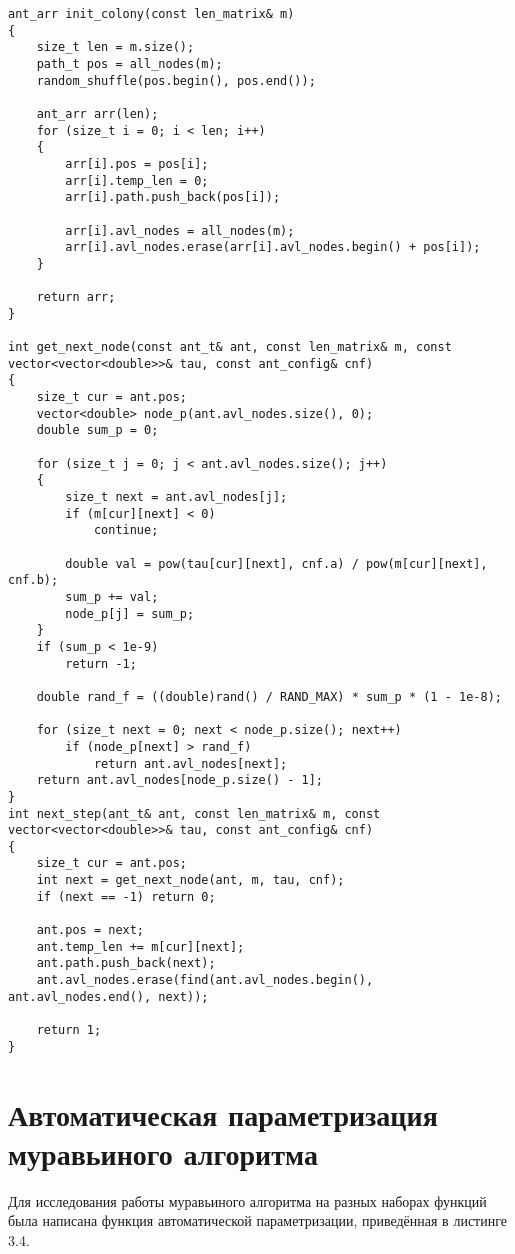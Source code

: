 \begin{lstlisting}[caption = {Поиск муравьиным алгоритмом (дополнительные функции)}]
ant_arr init_colony(const len_matrix& m)
{
	size_t len = m.size();
	path_t pos = all_nodes(m);
	random_shuffle(pos.begin(), pos.end());
	
	ant_arr arr(len);
	for (size_t i = 0; i < len; i++)
	{
		arr[i].pos = pos[i];
		arr[i].temp_len = 0;
		arr[i].path.push_back(pos[i]);
		
		arr[i].avl_nodes = all_nodes(m);
		arr[i].avl_nodes.erase(arr[i].avl_nodes.begin() + pos[i]);
	}
	
	return arr;
}

int get_next_node(const ant_t& ant, const len_matrix& m, const vector<vector<double>>& tau, const ant_config& cnf)
{
	size_t cur = ant.pos;
	vector<double> node_p(ant.avl_nodes.size(), 0);
	double sum_p = 0;
	
	for (size_t j = 0; j < ant.avl_nodes.size(); j++)
	{
		size_t next = ant.avl_nodes[j];
		if (m[cur][next] < 0)
			continue;
		
		double val = pow(tau[cur][next], cnf.a) / pow(m[cur][next], cnf.b);
		sum_p += val;
		node_p[j] = sum_p;
	}
	if (sum_p < 1e-9) 
		return -1; 
	
	double rand_f = ((double)rand() / RAND_MAX) * sum_p * (1 - 1e-8);
	
	for (size_t next = 0; next < node_p.size(); next++)
		if (node_p[next] > rand_f)
			return ant.avl_nodes[next];
	return ant.avl_nodes[node_p.size() - 1];
}
int next_step(ant_t& ant, const len_matrix& m, const vector<vector<double>>& tau, const ant_config& cnf)
{
	size_t cur = ant.pos;
	int next = get_next_node(ant, m, tau, cnf);
	if (next == -1)	return 0;
	
	ant.pos = next;
	ant.temp_len += m[cur][next];
	ant.path.push_back(next);
	ant.avl_nodes.erase(find(ant.avl_nodes.begin(), ant.avl_nodes.end(), next));	
	
	return 1;
}
\end{lstlisting}

\section{Автоматическая параметризация муравьиного алгоритма}
Для исследования работы муравьиного алгоритма на разных наборах функций была написана функция автоматической параметризации, приведённая в листинге 3.4.

